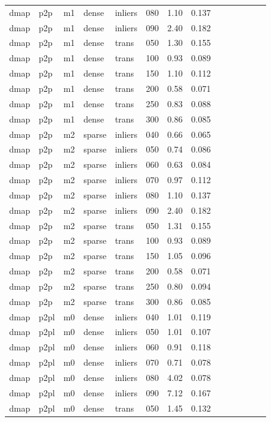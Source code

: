 \begin{table}[htbp]
\begin{tabular}{llllllrrrrrrrr}
  dmap & p2p & m1 & dense & inliers & 080 & 1.10 & 0.137 \\
  dmap & p2p & m1 & dense & inliers & 090 & 2.40 & 0.182 \\
  dmap & p2p & m1 & dense & trans & 050 & 1.30 & 0.155 \\
  dmap & p2p & m1 & dense & trans & 100 & 0.93 & 0.089 \\
  dmap & p2p & m1 & dense & trans & 150 & 1.10 & 0.112 \\
  dmap & p2p & m1 & dense & trans & 200 & 0.58 & 0.071 \\
  dmap & p2p & m1 & dense & trans & 250 & 0.83 & 0.088 \\
  dmap & p2p & m1 & dense & trans & 300 & 0.86 & 0.085 \\
  dmap & p2p & m2 & sparse & inliers & 040 & 0.66 & 0.065 \\
  dmap & p2p & m2 & sparse & inliers & 050 & 0.74 & 0.086 \\
  dmap & p2p & m2 & sparse & inliers & 060 & 0.63 & 0.084 \\
  dmap & p2p & m2 & sparse & inliers & 070 & 0.97 & 0.112 \\
  dmap & p2p & m2 & sparse & inliers & 080 & 1.10 & 0.137 \\
  dmap & p2p & m2 & sparse & inliers & 090 & 2.40 & 0.182 \\
  dmap & p2p & m2 & sparse & trans & 050 & 1.31 & 0.155 \\
  dmap & p2p & m2 & sparse & trans & 100 & 0.93 & 0.089 \\
  dmap & p2p & m2 & sparse & trans & 150 & 1.05 & 0.096 \\
  dmap & p2p & m2 & sparse & trans & 200 & 0.58 & 0.071 \\
  dmap & p2p & m2 & sparse & trans & 250 & 0.80 & 0.094 \\
  dmap & p2p & m2 & sparse & trans & 300 & 0.86 & 0.085 \\
  dmap & p2pl & m0 & dense & inliers & 040 & 1.01 & 0.119 \\
  dmap & p2pl & m0 & dense & inliers & 050 & 1.01 & 0.107 \\
  dmap & p2pl & m0 & dense & inliers & 060 & 0.91 & 0.118 \\
  dmap & p2pl & m0 & dense & inliers & 070 & 0.71 & 0.078 \\
  dmap & p2pl & m0 & dense & inliers & 080 & 4.02 & 0.078 \\
  dmap & p2pl & m0 & dense & inliers & 090 & 7.12 & 0.167 \\
  dmap & p2pl & m0 & dense & trans & 050 & 1.45 & 0.132 \\

\end{tabular}
\end{table}
